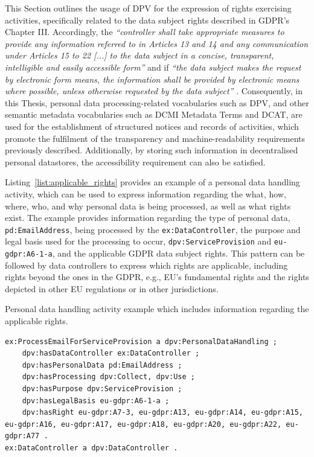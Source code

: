 This Section outlines the usage of DPV for the expression of rights exercising activities, specifically related to the data subject rights described in GDPR's Chapter III.
Accordingly, the \textit{``controller shall take appropriate measures to provide any information referred to in Articles 13 and 14 and any communication under Articles 15 to 22 [...] to the data subject in a concise, transparent, intelligible and easily accessible form''} and if \textit{``the data subject makes the request by electronic form means, the information shall be provided by electronic means where possible, unless otherwise requested by the data subject''} \citeyearpar{noauthor_regulation_2016}.
Consequently, in this Thesis, personal data processing-related vocabularies such as DPV, and other semantic metadata vocabularies such as DCMI Metadata Terms and DCAT, are used for the establishment of structured notices and records of activities, which promote the fulfilment of the transparency and machine-readability requirements previously described.
Additionally, by storing such information in decentralised personal datastores, the accessibility requirement can also be satisfied.

Listing~\ref{list:applicable_rights} provides an example of a personal data handling activity, which can be used to express information regarding the what, how, where, who, and why personal data is being processed, as well as what rights exist.
The example provides information regarding the type of personal data, \texttt{pd:EmailAddress}, being processed by the \texttt{ex:DataController}, the purpose and legal basis used for the processing to occur, \texttt{dpv:ServiceProvision} and \texttt{eu-gdpr:A6-1-a}, and the applicable GDPR data subject rights.
This pattern can be followed by data controllers to express which rights are applicable, including rights beyond the ones in the GDPR, e.g., EU's fundamental rights and the rights depicted in other EU regulations or in other jurisdictions.

\begin{listing}[htp]
\caption[Personal data handling activity with applicable rights.]{Personal data handling activity example which includes information regarding the applicable rights.}
\label{list:applicable_rights}
\begin{verbatim}
ex:ProcessEmailForServiceProvision a dpv:PersonalDataHandling ;
    dpv:hasDataController ex:DataController ;
    dpv:hasPersonalData pd:EmailAddress ;
    dpv:hasProcessing dpv:Collect, dpv:Use ;
    dpv:hasPurpose dpv:ServiceProvision ;
    dpv:hasLegalBasis eu-gdpr:A6-1-a ;
    dpv:hasRight eu-gdpr:A7-3, eu-gdpr:A13, eu-gdpr:A14, eu-gdpr:A15, eu-gdpr:A16, eu-gdpr:A17, eu-gdpr:A18, eu-gdpr:A20, eu-gdpr:A22, eu-gdpr:A77 .
ex:DataController a dpv:DataController .
\end{verbatim}
\end{listing}

